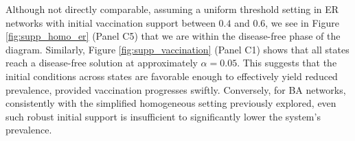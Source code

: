 \documentclass[
 reprint,
 amsmath,amssymb,
 aps,
]{revtex4-2}
\begin{document}
Although not directly comparable, assuming a uniform threshold setting in ER networks with initial vaccination support between $0.4$ and $0.6$, we see in Figure \ref{fig:supp_homo_er} (Panel C5) that we are within the disease-free phase of the diagram. Similarly, Figure \ref{fig:supp_vaccination} (Panel C1) shows that all states reach a disease-free solution at approximately $\alpha=0.05$. This suggests that the initial conditions across states are favorable enough to effectively yield reduced prevalence, provided vaccination progresses swiftly. Conversely, for BA networks, consistently with the simplified homogeneous setting previously explored, even such robust initial support is insufficient to significantly lower the system's prevalence. 

\clearpage


\end{document}
